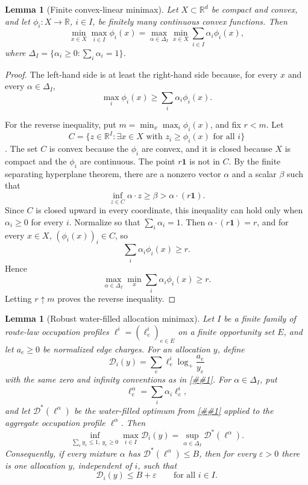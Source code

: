 \documentclass[10pt]{article}
\newcommand{\cref}[1]{\ref{##1}}
\newtheorem{lemma}[theorem]{Lemma}
\theoremstyle{definition}
\newcommand{\R}{\mathbb{R}}
\begin{document}
\begin{lemma}[Finite convex-linear minimax]\label{lem:finite-convex-minimax}
   Let \(X\subset\R^d\) be compact and convex, and let
   \(\phi_i:X\to\R\), \(i\in I\), be finitely many continuous convex
   functions. Then
   \[
      \min_{x\in X}\max_{i\in I}\phi_i(x)
      =
      \max_{\alpha\in\Delta_I}
      \min_{x\in X}\sum_{i\in I}\alpha_i\phi_i(x),
   \]
   where \(\Delta_I=\{\alpha_i\ge0:\sum_i\alpha_i=1\}\).
\end{lemma}

\begin{proof}
   The left-hand side is at least the right-hand side because, for every
   \(x\) and every \(\alpha\in\Delta_I\),
   \[
      \max_i\phi_i(x)\ge\sum_i\alpha_i\phi_i(x).
   \]

   For the reverse inequality, put
   \(m=\min_x\max_i\phi_i(x)\), and fix \(r<m\).  Let
   \[
      C=\{z\in\R^I:\exists x\in X\text{ with }z_i\ge\phi_i(x)\text{ for all }i\}
   \].
   The set \(C\) is convex because the \(\phi_i\) are convex, and it is closed
   because \(X\) is compact and the \(\phi_i\) are continuous.  The point
   \(r\mathbf 1\) is not in \(C\).  By the finite separating hyperplane
   theorem, there are a nonzero vector \(\alpha\) and a scalar \(\beta\) such
   that
   \[
      \inf_{z\in C}\alpha\cdot z
      \ge \beta
      >
      \alpha\cdot(r\mathbf 1).
   \]
   Since \(C\) is closed upward in every coordinate, this inequality can hold
   only when \(\alpha_i\ge0\) for every \(i\).  Normalize so that
   \(\sum_i\alpha_i=1\).  Then \(\alpha\cdot(r\mathbf 1)=r\), and for every
   \(x\in X\), \((\phi_i(x))_i\in C\), so
   \[
      \sum_i\alpha_i\phi_i(x)\ge r .
   \]
   Hence
   \[
      \max_{\alpha\in\Delta_I}\min_x\sum_i\alpha_i\phi_i(x)\ge r .
   \]
   Letting \(r\uparrow m\) proves the reverse inequality.
\end{proof}

\begin{lemma}[Robust water-filled allocation minimax]
   \label{lem:robust-waterfilled-minimax}
   Let \(I\) be a finite family of route-law occupation profiles
   \(\ell^i=(\ell^i_e)_{e\in E}\) on a finite opportunity set \(E\), and let
   \(a_e\ge0\) be normalized edge charges.  For an allocation \(y\), define
   \[
      \mathcal D_i(y)=
      \sum_e\ell^i_e\log_+\frac{a_e}{y_e}
   \]
   with the same zero and infinity conventions as in
   \cref{lem:waterfilled-allocation}.  For
   \(\alpha\in\Delta_I\), put
   \[
      \ell^\alpha_e=\sum_i\alpha_i\ell^i_e,
   \]
   and let \(\mathcal D^*(\ell^\alpha)\) be the water-filled optimum from
   \cref{lem:waterfilled-allocation} applied to the aggregate occupation
   profile \(\ell^\alpha\).  Then
   \[
      \inf_{\sum_e y_e\le1,\ y_e\ge0}\max_{i\in I}\mathcal D_i(y)
      =
      \sup_{\alpha\in\Delta_I}\mathcal D^*(\ell^\alpha).
   \]
   Consequently, if every mixture \(\alpha\) has
   \(\mathcal D^*(\ell^\alpha)\le B\), then for every \(\varepsilon>0\) there
   is one allocation \(y\), independent of \(i\), such that
   \[
      \mathcal D_i(y)\le B+\varepsilon
      \qquad\text{for all }i\in I.
   \]
\end{lemma}
\end{document}
